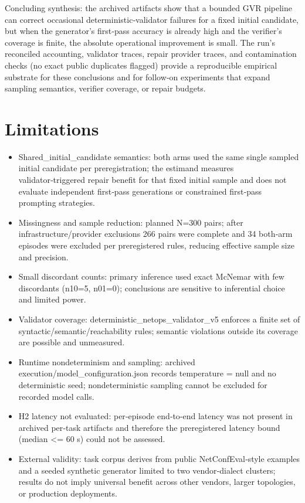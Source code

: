 \documentclass[conference]{IEEEtran}
\begin{document}
Concluding synthesis: the archived artifacts show that a bounded GVR pipeline can correct occasional deterministic‑validator failures for a fixed initial candidate, but when the generator's first‑pass accuracy is already high and the verifier's coverage is finite, the absolute operational improvement is small. The run's reconciled accounting, validator traces, repair provider traces, and contamination checks (no exact public duplicates flagged) provide a reproducible empirical substrate for these conclusions and for follow‑on experiments that expand sampling semantics, verifier coverage, or repair budgets.

\section{Limitations}
\begin{itemize}
\item Shared\_initial\_candidate semantics: both arms used the same single sampled initial candidate per preregistration; the estimand measures validator‑triggered repair benefit for that fixed initial sample and does not evaluate independent first‑pass generations or constrained first‑pass prompting strategies.
\item Missingness and sample reduction: planned N=300 pairs; after infrastructure/provider exclusions 266 pairs were complete and 34 both‑arm episodes were excluded per preregistered rules, reducing effective sample size and precision.
\item Small discordant counts: primary inference used exact McNemar with few discordants (n10=5, n01=0); conclusions are sensitive to inferential choice and limited power.
\item Validator coverage: deterministic\_netops\_validator\_v5 enforces a finite set of syntactic/semantic/reachability rules; semantic violations outside its coverage are possible and unmeasured.
\item Runtime nondeterminism and sampling: archived execution/model\_configuration.json records temperature = null and no deterministic seed; nondeterministic sampling cannot be excluded for recorded model calls.
\item H2 latency not evaluated: per‑episode end‑to‑end latency was not present in archived per‑task artifacts and therefore the preregistered latency bound (median <= 60 s) could not be assessed.
\item External validity: task corpus derives from public NetConfEval‑style examples and a seeded synthetic generator limited to two vendor‑dialect clusters; results do not imply universal benefit across other vendors, larger topologies, or production deployments.
\end{itemize}
\end{document}
